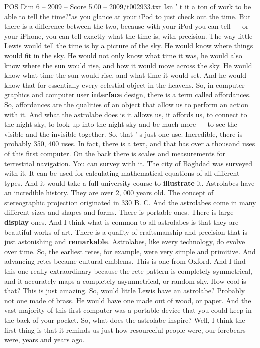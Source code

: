 \begin{textsample}{POS Dim 6 – 2009 – Score 5.00 – 2009/t002933.txt}
Isn ' t it a ton of work to be able to tell the time?"as you glance at your iPod to just check out the time.
But there is a difference between the two, because with your iPod you can tell — or your iPhone, you can tell exactly what the time is, with precision.
The way little Lewis would tell the time is by a picture of the sky.
He would know where things would fit in the sky.
He would not only know what time it was, he would also know where the sun would rise, and how it would move across the sky.
He would know what time the sun would rise, and what time it would set.
And he would know that for essentially every celestial object in the heavens.
So, in computer graphics and computer user \textbf{interface} design, there is a term called affordances.
So, affordances are the qualities of an object that allow us to perform an action with it.
And what the astrolabe does is it allows us, it affords us, to connect to the night sky, to look up into the night sky and be much more — to see the visible and the invisible together.
So, that ' s just one use.
Incredible, there is probably 350, 400 uses.
In fact, there is a text, and that has over a thousand uses of this first computer.
On the back there is scales and measurements for terrestrial navigation.
You can survey with it.
The city of Baghdad was surveyed with it.
It can be used for calculating mathematical equations of all different types.
And it would take a full university course to \textbf{illustrate} it.
Astrolabes have an incredible history.
They are over 2, 000 years old.
The concept of stereographic projection originated in 330 B.
C.
And the astrolabes come in many different sizes and shapes and forms.
There is portable ones.
There is large \textbf{display} ones.
And I think what is common to all astrolabes is that they are beautiful works of art.
There is a quality of craftsmanship and precision that is just astonishing and \textbf{remarkable}.
Astrolabes, like every technology, do evolve over time.
So, the earliest retes, for example, were very simple and primitive.
And advancing retes became cultural emblems.
This is one from Oxford.
And I find this one really extraordinary because the rete pattern is completely symmetrical, and it accurately maps a completely asymmetrical, or random sky.
How cool is that?
This is just amazing.
So, would little Lewis have an astrolabe?
Probably not one made of brass.
He would have one made out of wood, or paper.
And the vast majority of this first computer was a portable device that you could keep in the back of your pocket.
So, what does the astrolabe inspire?
Well, I think the first thing is that it reminds us just how resourceful people were, our forebears were, years and years ago.

\end{textsample}
